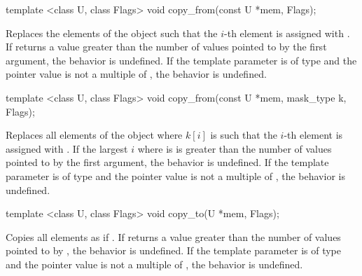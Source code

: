 \begin{itemdecl}
template <class U, class Flags> void copy_from(const U *mem, Flags);
\end{itemdecl}
\begin{itemdescr}
  \pnum\effects Replaces the elements of the \datapar object such that the $i$-th element is assigned with  \foralli.
  \pnum\remarks If  returns a value greater than the number of values pointed to by the first argument, the behavior is undefined.
  \pnum\remarks If the  template parameter is of type  and the pointer value is not a multiple of , the behavior is undefined.
\end{itemdescr}

\begin{itemdecl}
template <class U, class Flags> void copy_from(const U *mem, mask_type k, Flags);
\end{itemdecl}
\begin{itemdescr}
  \pnum\effects Replaces all elements of the \datapar object where $k[i]$ is \true such that the $i$-th element is assigned with  \foralli.
  \pnum\remarks If the largest $i$ where  is \true is greater than the number of values pointed to by the first argument, the behavior is undefined.
  \pnum\remarks If the  template parameter is of type  and the pointer value is not a multiple of , the behavior is undefined.
\end{itemdescr}

\begin{itemdecl}
template <class U, class Flags> void copy_to(U *mem, Flags);
\end{itemdecl}
\begin{itemdescr}
  \pnum\effects Copies all \datapar elements as if  \foralli.
  \pnum\remarks If  returns a value greater than the number of values pointed to by , the behavior is undefined.
  \pnum\remarks If the  template parameter is of type  and the pointer value is not a multiple of , the behavior is undefined.
\end{itemdescr}

